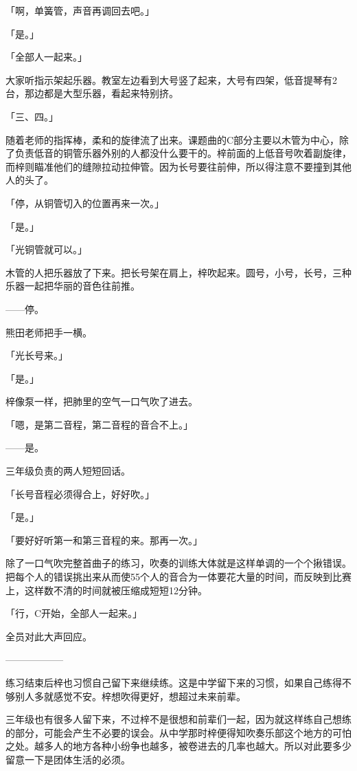 \documentclass[UTF8]{ctexart}
\begin{document}
    「啊，单簧管，声音再调回去吧。」

    「是。」

    「全部人一起来。」

    大家听指示架起乐器。教室左边看到大号竖了起来，大号有四架，低音提琴有2台，那边都是大型乐器，看起来特别挤。

    「三、四。」

    随着老师的指挥棒，柔和的旋律流了出来。课题曲的C部分主要以木管为中心，除了负责低音的铜管乐器外别的人都没什么要干的。梓前面的上低音号吹着副旋律，而梓则瞄准他们的缝隙拉动拉伸管。因为长号要往前伸，所以得注意不要撞到其他人的头了。

    「停，从铜管切入的位置再来一次。」

    「是。」

    「光铜管就可以。」

    木管的人把乐器放了下来。把长号架在肩上，梓吹起来。圆号，小号，长号，三种乐器一起把华丽的音色往前推。

    ——停。

    熊田老师把手一横。

    「光长号来。」

    「是。」

    梓像泵一样，把肺里的空气一口气吹了进去。

    「嗯，是第二音程，第二音程的音合不上。」

    ——是。

    三年级负责的两人短短回话。

    「长号音程必须得合上，好好吹。」

    「是。」

    「要好好听第一和第三音程的来。那再一次。」

    除了一口气吹完整首曲子的练习，吹奏的训练大体就是这样单调的一个个揪错误。把每个人的错误挑出来从而使55个人的音合为一体要花大量的时间，而反映到比赛上，这样数不清的时间就被压缩成短短12分钟。

    「行，C开始，全部人一起来。」

    全员对此大声回应。

    ——————

    练习结束后梓也习惯自己留下来继续练。这是中学留下来的习惯，如果自己练得不够别人多就感觉不安。梓想吹得更好，想超过未来前辈。

    三年级也有很多人留下来，不过梓不是很想和前辈们一起，因为就这样练自己想练的部分，可能会产生不必要的误会。从中学那时梓便得知吹奏乐部这个地方的可怕之处。越多人的地方各种小纷争也越多，被卷进去的几率也越大。所以对此要多少留意一下是团体生活的必须。
\end{document}

